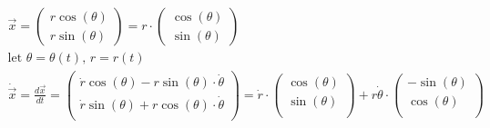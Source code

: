 \documentclass[11pt, a4paper]{article}
\begin{document}
\begin{gather}
\vec{x} = \begin{pmatrix} r\cos(\theta) \\ r\sin(\theta) \end{pmatrix}
    = r \cdot \begin{pmatrix} \cos(\theta) \\ \sin(\theta) \end{pmatrix}\\
    \text{let $\theta = \theta(t)$, $r = r(t)$}\\
    \dot{\vec{x}} = \frac{d\vec{x}}{dt} =  
        \begin{pmatrix} 
            \dot{r}\cos(\theta) - r\sin(\theta) \cdot \dot{\theta}\\
            \dot{r}\sin(\theta) + r\cos(\theta) \cdot \dot{\theta}\\
        \end{pmatrix}
    = \dot{r} \cdot \begin{pmatrix} \cos(\theta) \\ \sin(\theta)\\ \end{pmatrix}
        + r\dot{\theta} \cdot \begin{pmatrix} -\sin(\theta) \\ \cos(\theta)\\ \end{pmatrix}
\end{gather}
\end{document}
